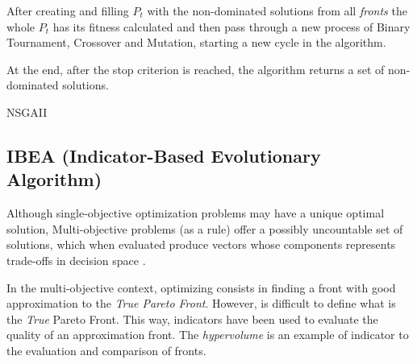 After creating and filling $P_t$ with the non-dominated solutions from all \textit{fronts} the whole $P_t$ has its fitness calculated and then pass through a new process of Binary Tournament, Crossover and Mutation, starting a new cycle in the algorithm.


At the end, after the stop criterion is reached, the algorithm returns a set of non-dominated  solutions.


\begin{algorithm}[htb!]
	\begin{algorithmic}[1]
		\EndWhile
			\EndWhile
			
		\EndWhile
	\end{algorithmic}
	\caption{NSGAII}
	\label{alg:nsgaII}
\end{algorithm}


\subsection{IBEA (Indicator-Based Evolutionary Algorithm)}


Although single-objective optimization problems may have a unique optimal solution, Multi-objective problems (as a rule) offer a possibly uncountable set of solutions, which when evaluated produce vectors whose components represents trade-offs in decision space \cite{van1998evolutionary}.


In the multi-objective context, optimizing consists in finding a front with good approximation to the \textit{True Pareto Front}. However, is difficult to define what is the \textit{True} Pareto Front. This way, indicators have been used to evaluate the quality of an approximation front. The \textit{hypervolume} is an example of indicator to the evaluation and comparison of fronts.


